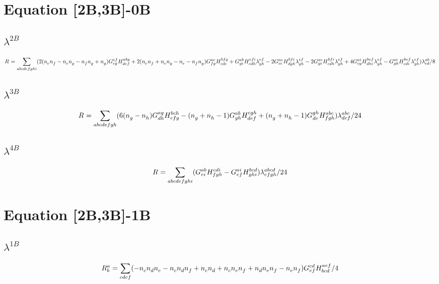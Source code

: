 \documentclass{scrartcl}
\begin{document}
    
\section{Equation [2B,3B]-0B}
\subsection{$\lambda^{2B}$}
\begin{dmath*}
R^{}_{} = \sum_{abcdefghi} (2 \* (n^{}_{e} \* n^{}_{f}-n^{}_{e} \* n^{}_{g}-n^{}_{f} \* n^{}_{g}+n^{}_{g}) \* G^{ef}_{cg} \* H^{abg}_{def}+2 \* (n^{}_{e} \* n^{}_{f}+n^{}_{e} \* n^{}_{g}-n^{}_{e}-n^{}_{f} \* n^{}_{g}) \* G^{ae}_{fg} \* H^{bfg}_{cde}+G^{ab}_{gi} \* H^{efi}_{cdh} \* \lambda^{ef}_{gh}-2 \* G^{ae}_{ci} \* H^{bfi}_{dgh} \* \lambda^{ef}_{gh}-2 \* G^{ae}_{gi} \* H^{bfi}_{cdh} \* \lambda^{ef}_{gh}+4 \* G^{ai}_{cg} \* H^{bef}_{dhi} \* \lambda^{ef}_{gh}-G^{ai}_{gh} \* H^{bef}_{cdi} \* \lambda^{ef}_{gh}) \* \lambda^{ab}_{cd}/8
\end{dmath*}
\subsection{$\lambda^{3B}$}
\begin{dmath*}
R^{}_{} = \sum_{abcdefgh} (6 \* (n^{}_{g}-n^{}_{h}) \* G^{ag}_{dh} \* H^{bch}_{efg}-(n^{}_{g}+n^{}_{h}-1) \* G^{ab}_{gh} \* H^{cgh}_{def}+(n^{}_{g}+n^{}_{h}-1) \* G^{gh}_{de} \* H^{abc}_{fgh}) \* \lambda^{abc}_{def}/24
\end{dmath*}
\subsection{$\lambda^{4B}$}
\begin{dmath*}
R^{}_{} = \sum_{abcdefghi} (G^{ab}_{ei} \* H^{cdi}_{fgh}-G^{ai}_{ef} \* H^{bcd}_{ghi}) \* \lambda^{abcd}_{efgh}/24
\end{dmath*}
\section{Equation [2B,3B]-1B}
\subsection{$\lambda^{1B}$}
\begin{dmath*}
R^{a}_{b} = \sum_{cdef} (-n^{}_{c} \* n^{}_{d} \* n^{}_{e}-n^{}_{c} \* n^{}_{d} \* n^{}_{f}+n^{}_{c} \* n^{}_{d}+n^{}_{c} \* n^{}_{e} \* n^{}_{f}+n^{}_{d} \* n^{}_{e} \* n^{}_{f}-n^{}_{e} \* n^{}_{f}) \* G^{cd}_{ef} \* H^{aef}_{bcd}/4
\end{dmath*}
\end{document}
